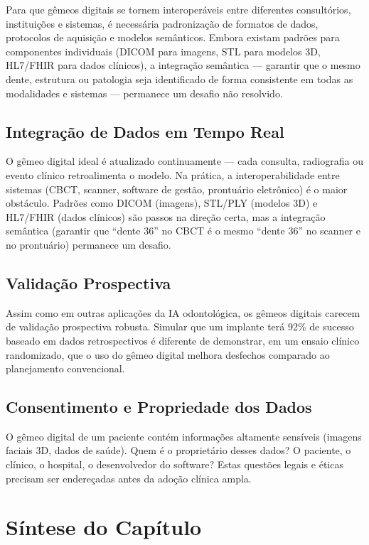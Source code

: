 Para que gêmeos digitais se tornem interoperáveis entre diferentes consultórios, instituições e sistemas, é necessária padronização de formatos de dados, protocolos de aquisição e modelos semânticos. Embora existam padrões para componentes individuais (DICOM para imagens, STL para modelos 3D, HL7/FHIR para dados clínicos), a integração semântica --- garantir que o mesmo dente, estrutura ou patologia seja identificado de forma consistente em todas as modalidades e sistemas --- permanece um desafio não resolvido.

\subsection{Integração de Dados em Tempo Real}

O gêmeo digital ideal é atualizado continuamente --- cada consulta, radiografia ou evento clínico retroalimenta o modelo. Na prática, a interoperabilidade entre sistemas (CBCT, scanner, software de gestão, prontuário eletrônico) é o maior obstáculo. Padrões como DICOM (imagens), STL/PLY (modelos 3D) e HL7/FHIR (dados clínicos) são passos na direção certa, mas a integração semântica (garantir que ``dente 36'' no CBCT é o mesmo ``dente 36'' no scanner e no prontuário) permanece um desafio.

\subsection{Validação Prospectiva}

Assim como em outras aplicações da IA odontológica, os gêmeos digitais carecem de validação prospectiva robusta. Simular que um implante terá 92\% de sucesso baseado em dados retrospectivos é diferente de demonstrar, em um ensaio clínico randomizado, que o uso do gêmeo digital melhora desfechos comparado ao planejamento convencional.

\subsection{Consentimento e Propriedade dos Dados}

O gêmeo digital de um paciente contém informações altamente sensíveis (imagens faciais 3D, dados de saúde). Quem é o proprietário desses dados? O paciente, o clínico, o hospital, o desenvolvedor do software? Estas questões legais e éticas precisam ser endereçadas antes da adoção clínica ampla.

\section{Síntese do Capítulo}

